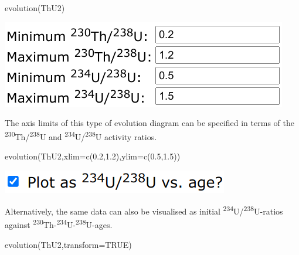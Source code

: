 \begin{refsection}
\begin{enumerate}
\begin{console}
evolution(ThU2)
\end{console}

  \noindent\begin{minipage}[t]{.4\linewidth}
  \strut\vspace*{-\baselineskip}\newline
  \includegraphics[width=\linewidth]{../figures/ThUformat12evolutionLimits.png}
  \end{minipage}
  \begin{minipage}[t]{.6\linewidth}
    The axis limits of this type of evolution diagram can be specified in
    terms of the \textsuperscript{230}Th/\textsuperscript{238}U and
    \textsuperscript{234}U/\textsuperscript{238}U activity ratios.
  \end{minipage}

\begin{console}
evolution(ThU2,xlim=c(0.2,1.2),ylim=c(0.5,1.5))
\end{console}

  \noindent\begin{minipage}[t]{.3\linewidth}
  \strut\vspace*{-\baselineskip}\newline
  \includegraphics[width=\linewidth]{../figures/ThUvsAge.png}
  \end{minipage}
  \begin{minipage}[t]{.7\linewidth}
    Alternatively, the same data can also be visualised as initial
    \textsuperscript{234}U/\textsuperscript{238}U-ratios against
    \textsuperscript{230}Th-\textsuperscript{234}U-\textsuperscript{238}U-ages.
  \end{minipage}

\begin{console}
evolution(ThU2,transform=TRUE)
\end{console}


\end{enumerate}
\end{refsection}
